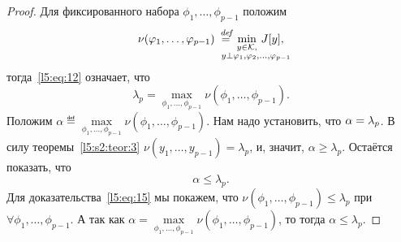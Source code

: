 \begin{proof}
	Для фиксированного набора $\phi_1,\ldots,\phi_{p-1}$ положим
	\begin{equation}
		\label{l5:eq:13}
		\nu(\phi_1,\ldots,\phi_{p-1})\eqdef\min\limits_{\substack{y\in\K,\\\lefteqn{\scriptstyle \hspace*{-0.8cm}y\perp\phi_1,\phi_2,\ldots,\phi_{p-1}}}}\,J[y],
	\end{equation}
	тогда~\eqref{l5:eq:12} означает, что
	\begin{equation}
		\label{l5:eq:14}
		\lambda_p=\max\limits_{\phi_1,\ldots,\phi_{p-1}}\nu(\phi_1,\ldots,\phi_{p-1}).
	\end{equation}
	Положим $\displaystyle\alpha\eqdef\max\limits_{\phi_1,\ldots,\phi_{p-1}}\nu(\phi_1,\ldots,\phi_{p-1})$. Нам надо установить, что $\alpha\?=\lambda_p$. В силу теоремы~\ref{l5:s2:teor:3} $\nu(y_1,\ldots,y_{p-1})=\lambda_p${\mb,} и{\mb,} значит{\mb,} $\alpha\geqslant\lambda_p$. Остаётся показать, что
	\begin{equation}
		\label{l5:eq:15}
		\alpha\leqslant\lambda_p.
	\end{equation} 
	Для доказательства~\eqref{l5:eq:15} мы покажем, что $\nu(\phi_1,\ldots,\phi_{p-1})\leqslant\lambda_p$ при $\forall\phi_1,\ldots,\phi_{p-1}$. А так как $\alpha=\max\limits_{\phi_1,\ldots,\phi_{p-1}}\nu(\phi_1,\ldots,\phi_{p-1})$, то тогда $\alpha\leqslant\lambda_p$.
	

\end{proof}
